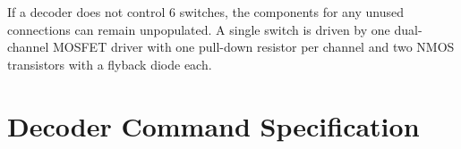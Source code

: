 \documentclass{scrreprt}
\begin{document}
If a decoder does not control 6 switches, the components for any unused connections can remain unpopulated.
A single switch is driven by one dual-channel MOSFET driver with one pull-down resistor per channel and two NMOS transistors with a flyback diode each.


\chapter{Decoder Command Specification}
\end{document}
